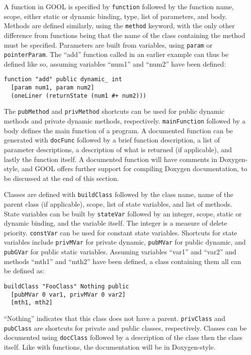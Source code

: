 \documentclass[sigplan,review,anonymous]{acmart}
\begin{document}
A function in GOOL is specified by \verb|function| followed by the function 
name, scope, either static or dynamic binding, type, list of parameters, and 
body. Methods are defined similarly, using the \verb|method| keyword, with the 
only other difference from functions being that the name of the class 
containing the method must be specified. Parameters are built from variables, 
using \verb|param| or \verb|pointerParam|. The ``add'' function called in 
an earlier example can thus be defined like so, assuming variables ``num1'' and 
``num2'' have been defined:
\begin{lstlisting}
function "add" public dynamic_ int 
  [param num1, param num2] 
  (oneLiner (returnState (num1 #+ num2)))
\end{lstlisting}
The  \verb|pubMethod| and \verb|privMethod| shortcuts can be used for public 
dynamic methods and private dynamic methods, respectively. \verb|mainFunction| 
followed by a body defines the main function of a program. A documented 
function can be generated with \verb|docFunc| followed by a brief function 
description, a list of parameter descriptions, a description of what is 
returned (if applicable), and lastly the function itself. A documented function 
will have comments in Doxygen-style, and GOOL offers further support for 
compiling Doxygen documentation, to be discussed at the end of this section.

Classes are defined with \verb|buildClass| followed by the class name, name of 
the parent class (if applicable), scope, list of state variables, and list of 
methods. State variables can be built by \verb|stateVar| followed by an 
integer, scope, static or dynamic binding, and the variable itself. The integer 
is a measure of delete priority. \verb|constVar| can be used for constant state 
variables. Shortcuts for state variables include \verb|privMVar| for private 
dynamic, \verb|pubMVar| for public dynamic, and \verb|pubGVar| for public 
static variables. Assuming variables ``var1'' and ``var2'' and methods ``mth1'' 
and ``mth2'' have been defined, a class containing them all can be defined as:
\begin{lstlisting}
buildClass "FooClass" Nothing public 
  [pubMVar 0 var1, privMVar 0 var2] 
  [mth1, mth2]
\end{lstlisting}
``Nothing'' indicates that this class does not have a parent. \verb|privClass| 
and \verb|pubClass| are shortcuts for private and public classes, respectively. 
Classes can be documented using \verb|docClass| followed by a description of 
the class then the class itself. Like with functions, the documentation will be 
in Doxygen-style.
\end{document}
